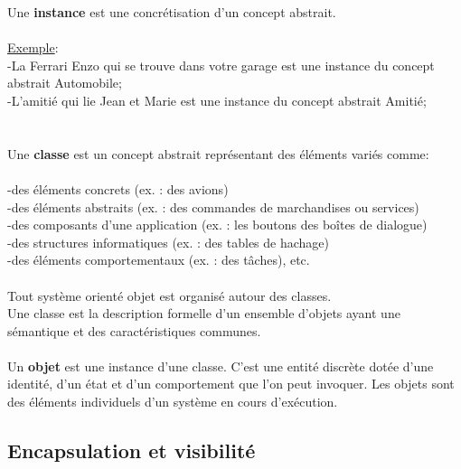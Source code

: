 \documentclass[a4paper,12pt,openany]{book}
\begin{document}
Une \textbf{instance} est une concrétisation d'un concept abstrait. \\
\\
\underline{Exemple}:\\
-La Ferrari Enzo qui se trouve dans votre garage est une instance du concept abstrait Automobile;\\
-L'amitié qui lie Jean et Marie est une instance du concept abstrait Amitié;\\
\\
\\
Une \textbf{classe} est un concept abstrait représentant des éléments variés comme:\\
\\
-des éléments concrets (ex. : des avions)\\
-des éléments abstraits (ex. : des commandes de marchandises ou services)\\
-des composants d'une application (ex. : les boutons des boîtes de dialogue)\\
-des structures informatiques (ex. : des tables de hachage)\\
-des éléments comportementaux (ex. : des tâches), etc.\\
\\
Tout système orienté objet est organisé autour des classes.\\
Une classe est la description formelle d'un ensemble d'objets ayant une sémantique et des caractéristiques communes.\\
\\
Un \textbf{objet} est une instance d'une classe. C'est une entité discrète dotée d'une identité, d'un état et d'un comportement que l'on peut invoquer. Les objets sont des éléments individuels d'un système en cours d'exécution.\\


\subsection{Encapsulation et visibilité}
\end{document}

